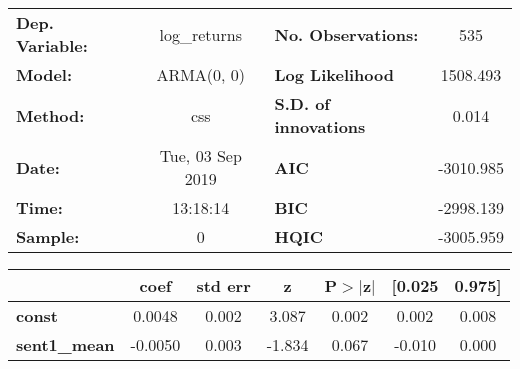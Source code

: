 \begin{center}
\begin{tabular}{lclc}
\toprule
\textbf{Dep. Variable:} &   log\_returns   & \textbf{  No. Observations:  } &    535      \\
\textbf{Model:}         &    ARMA(0, 0)    & \textbf{  Log Likelihood     } &  1508.493   \\
\textbf{Method:}        &       css        & \textbf{  S.D. of innovations} &   0.014     \\
\textbf{Date:}          & Tue, 03 Sep 2019 & \textbf{  AIC                } & -3010.985   \\
\textbf{Time:}          &     13:18:14     & \textbf{  BIC                } & -2998.139   \\
\textbf{Sample:}        &        0         & \textbf{  HQIC               } & -3005.959   \\
\bottomrule
\end{tabular}
\begin{tabular}{lcccccc}
                     & \textbf{coef} & \textbf{std err} & \textbf{z} & \textbf{P$> |$z$|$} & \textbf{[0.025} & \textbf{0.975]}  \\
\midrule
\textbf{const}       &       0.0048  &        0.002     &     3.087  &         0.002        &        0.002    &        0.008     \\
\textbf{sent1\_mean} &      -0.0050  &        0.003     &    -1.834  &         0.067        &       -0.010    &        0.000     \\
\bottomrule
\end{tabular}
\end{center}
